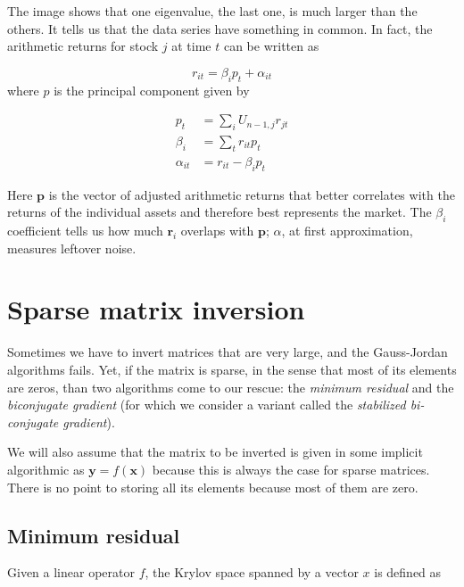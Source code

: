 \documentclass[justified,sixbynine]{tufte-book}
\theoremstyle{plain}%
\theoremstyle{definition}
\theoremstyle{remark}
\begin{document}
\begin{fullwidth}

The image shows that one eigenvalue, the last one, is much larger than the others. It tells us that the data series have something in common. In fact, the arithmetic returns for stock $j$ at time $t$ can be written as

\begin{equation}
r_{it} = \beta_i p_t + \alpha_{it}
\end{equation}
where $p$ is the principal component given by

\begin{align}
p_t &= \sum_i U_{n-1,j} r_{jt} \\
\beta_i &= \sum_t r_{it} p_t \\
\alpha_{it} &= r_{it} - \beta_i p_t
\end{align}

Here $\mathbf{p}$ is the vector of adjusted arithmetic returns that better correlates with the returns of the individual assets and therefore best represents the market. The $\beta_i$ coefficient tells us how much $\mathbf{r}_i$ overlaps with $\mathbf{p}$; $\alpha$, at first approximation, measures leftover noise.

\goodbreak\section{Sparse matrix inversion}


Sometimes we have to invert matrices that are very large, and the Gauss-Jordan algorithms fails. Yet, if the matrix is sparse, in the sense that most of its elements are zeros, than two algorithms come to our rescue: the {\it minimum residual} and the {\it biconjugate gradient} (for which we consider a variant called the {\it stabilized bi-conjugate gradient}).

We will also assume that the matrix to be inverted is given in some implicit algorithmic as $\mathbf{y}=f(\mathbf{x})$ because this is always the case for sparse matrices. There is no point to storing all its elements because most of them are zero.

\goodbreak\subsection{Minimum residual}


Given a linear operator $f$, the Krylov space spanned by a vector $x$ is defined as


\end{fullwidth}
\end{document}
